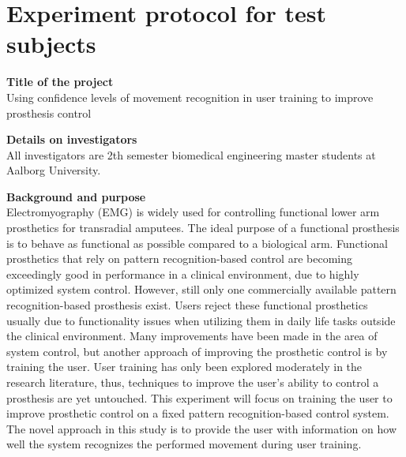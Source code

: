 \section{Experiment protocol for test subjects} \label{sec:Eprot}

\textbf{Title of the project} \\
Using confidence levels of movement recognition in user training to improve prosthesis control 

\textbf{Details on investigators} \\
All investigators are 2th semester biomedical engineering master students at Aalborg University.  

\textbf{Background and purpose} \\
Electromyography (EMG) is widely used for controlling functional lower arm prosthetics for transradial amputees. The ideal purpose of a functional prosthesis is to behave as functional as possible compared to a biological arm. Functional prosthetics that rely on pattern recognition-based control are becoming exceedingly good in performance in a clinical environment, due to highly optimized system control. However, still only one commercially available pattern recognition-based prosthesis exist. Users reject these functional prosthetics usually due to functionality issues when utilizing them in daily life tasks outside the clinical environment. Many improvements have been made in the area of system control, but another approach of improving the prosthetic control is by training the user. User training has only been explored moderately in the research literature, thus, techniques to improve the user's ability to control a prosthesis are yet untouched. This experiment will focus on training the user to improve prosthetic control on a fixed pattern recognition-based control system. The novel approach in this study is to provide the user with information on how well the system recognizes the performed movement during user training. 


